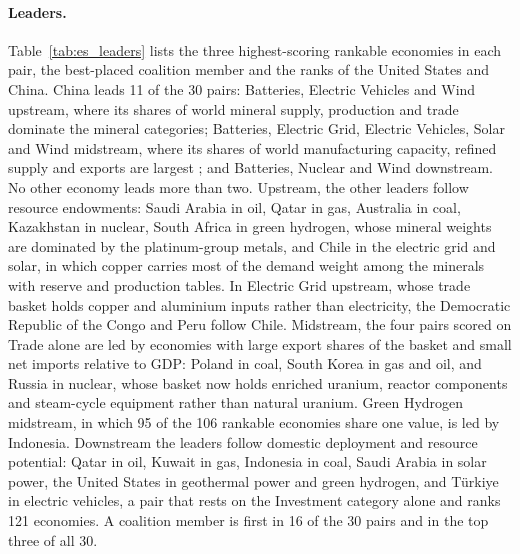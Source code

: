 \paragraph{Leaders.} Table~\ref{tab:es_leaders} lists the three highest-scoring rankable
economies in each pair, the best-placed coalition member and the ranks of the United States and
China. China leads 11 of the 30 pairs: Batteries, Electric Vehicles and Wind upstream, where its
shares of world mineral supply, production and trade dominate the mineral categories; Batteries,
Electric Grid, Electric Vehicles, Solar and Wind midstream, where its shares of world
manufacturing capacity, refined supply and exports are largest \citep{iea2024etp,iea2025gcmo};
and Batteries, Nuclear and Wind downstream. No other economy leads more than two. Upstream, the
other leaders follow resource endowments: Saudi Arabia in oil, Qatar in gas, Australia in coal,
Kazakhstan in nuclear, South Africa in green hydrogen, whose mineral weights are dominated by the
platinum-group metals, and Chile in the electric grid and solar, in which copper carries most of
the demand weight among the minerals with reserve and production tables. In Electric Grid
upstream, whose trade basket holds copper and aluminium inputs rather than electricity, the
Democratic Republic of the Congo and Peru follow Chile. Midstream, the four pairs scored on
Trade alone are led by economies with large export shares of the basket and small net imports
relative to GDP: Poland in coal, South Korea in gas and oil, and Russia in nuclear, whose basket
now holds enriched uranium, reactor components and steam-cycle equipment rather than natural
uranium. Green Hydrogen midstream, in which 95 of the 106 rankable economies share one value, is
led by Indonesia. Downstream the leaders follow domestic deployment and resource potential: Qatar
in oil, Kuwait in gas, Indonesia in coal, Saudi Arabia in solar power, the United States in
geothermal power and green hydrogen, and T\"urkiye in electric vehicles, a pair that rests on the
Investment category alone and ranks 121 economies. A coalition member is first in 16 of the 30
pairs and in the top three of all 30.

